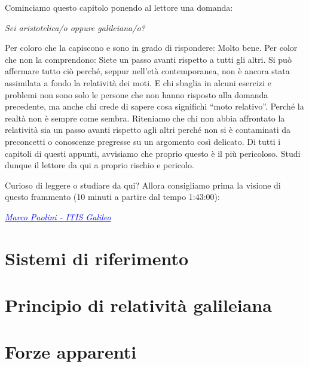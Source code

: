 \marginpar{\minitoc}

Cominciamo questo capitolo ponendo al lettore una domanda:

\begin{center}
    \textit{Sei aristotelica/o oppure galileiana/o?}
\end{center}

\noindent Per coloro che la capiscono e sono in grado di rispondere:
Molto bene. Per color che non la comprendono: Siete un passo avanti
rispetto a tutti gli altri. Si può affermare tutto ciò perché, seppur
nell'età contemporanea, non è ancora stata assimilata a fondo la
relatività dei moti. E chi sbaglia in alcuni esercizi e problemi
non sono solo le persone che non hanno risposto alla domanda precedente,
ma anche chi crede di sapere cosa significhi ``moto relativo''. Perché
la realtà non è sempre come sembra. Riteniamo che chi non abbia affrontato
la relatività sia un passo avanti rispetto agli altri perché non si è
contaminati da preconcetti o conoscenze pregresse su un argomento così
delicato. Di tutti i capitoli di questi appunti, avvisiamo che proprio
questo è il più pericoloso. Studi dunque il lettore da qui a proprio
rischio e pericolo.

Curioso di leggere o studiare da qui? Allora consigliamo prima la visione
di questo frammento (10 minuti a partire dal tempo 1:43:00):

\begin{center}
    \href{https://youtu.be/0kxarmulkiA?feature=shared&t=6180}{\textcolor{blue}{\textit{Marco Paolini - ITIS Galileo}}}
\end{center}

\section{Sistemi di riferimento}
\section{Principio di relatività galileiana}
\section{Forze apparenti}